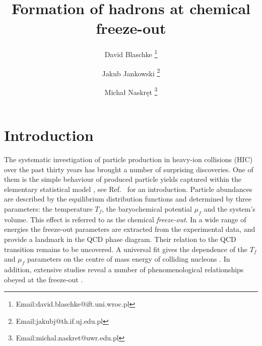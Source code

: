 \documentclass[12pt]{article}
\begin{document}
\def\lsim{\stackrel{\scriptstyle <}{\phantom{}_{\sim}}}
\def\gsim{\stackrel{\scriptstyle >}{\phantom{}_{\sim}}}

\title{\bf  Formation of hadrons at chemical freeze-out}

\author{David Blaschke
\footnote{Email:david.blaschke@ift.uni.wroc.pl}}
\author{Jakub Jankowski
\footnote{Email:jakubj@th.if.uj.edu.pl}}
\author{Michał Naskręt
\footnote{Email:michal.naskret@uwr.edu.pl }}



\linespread{1.4}
\parskip=6pt
\parindent=0pt


\maketitle

\thispagestyle{empty}



\newpage



\section{Introduction}

The systematic investigation of particle production in heavy-ion collisions (HIC) over the past thirty years
has brought a number of surprising discoveries. 
One of them is the simple behaviour of produced particle yields captured within the elementary statistical model \cite{Adamczyk:2017iwn,BraunMunzinger:2001ip,Broniowski:2001we,Petran:2013lja,Petran:2013qla,Cleymans:2005xv,Andronic:2005yp}, see Ref.~\cite{BraunMunzinger:2003zd} for an introduction. 
Particle abundances are described by the equilibrium distribution functions and determined by three parameters: the temperature $T_f$, the baryochemical potential $\mu_f$ and the system's volume.
This effect is referred to as the chemical {\it freeze-out}.
In a wide range of energies the freeze-out parameters are extracted from the experimental data, and provide a landmark in the QCD phase diagram. 
Their relation to the QCD  transition remains to be uncovered. 
A universal fit gives the dependence of the $T_f$ and $\mu_f$ parameters on the centre of mass energy
of colliding nucleons  \cite{Cleymans:2005xv,Andronic:2005yp}. 
In addition, extensive studies reveal a number of phenomenological relationships obeyed at the 
freeze-out \cite{Cleymans:2005xv,Petran:2013qla}. 
	 
\end{document}
